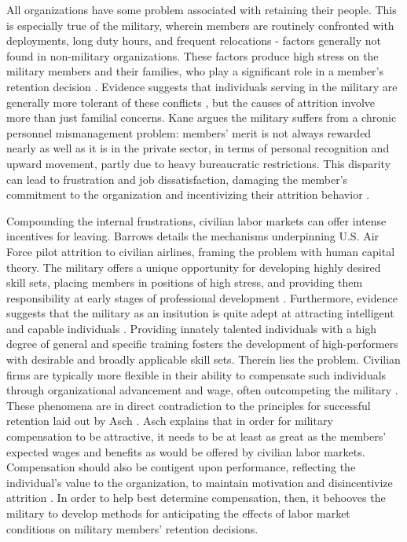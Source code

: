 \documentclass[12pt,letterpaper,toc=flat,oneside]{report}
\theoremstyle{definition}
\theoremstyle{definition}
\theoremstyle{definition}
\theoremstyle{remark}
\begin{document}
All organizations have some problem associated with retaining their
people. This is especially true of the military, wherein members are
routinely confronted with deployments, long duty hours, and frequent
relocations - factors generally not found in non-military organizations.
These factors produce high stress on the military members and their
families, who play a significant role in a member's retention decision
\cite{fugita-lakhani-1991}. Evidence suggests that individuals serving
in the military are generally more tolerant of these conflicts
\cite{capon-etal-2007}, but the causes of attrition involve more than
just familial concerns. Kane \cite{kane-2012} argues the military
suffers from a chronic personnel mismanagement problem: members' merit
is not always rewarded nearly as well as it is in the private sector, in
terms of personal recognition and upward movement, partly due to heavy
bureaucratic restrictions. This disparity can lead to frustration and
job dissatisfaction, damaging the member's commitment to the
organization and incentivizing their attrition behavior
\cite{capon-etal-2007}.

Compounding the internal frustrations, civilian labor markets can offer
intense incentives for leaving. Barrows \cite{barrows-1993} details the
mechanisms underpinning U.S. Air Force pilot attrition to civilian
airlines, framing the problem with human capital theory. The military
offers a unique opportunity for developing highly desired skill sets,
placing members in positions of high stress, and providing them
responsibility at early stages of professional development
\cite{kane-2012}. Furthermore, evidence suggests that the military as an
insitution is quite adept at attracting intelligent and capable
individuals \cite{asch-hosek-2004}. Providing innately talented
individuals with a high degree of general and specific training fosters
the development of high-performers with desirable and broadly applicable
skill sets. Therein lies the problem. Civilian firms are typically more
flexible in their ability to compensate such individuals through
organizational advancement and wage, often outcompeting the military
\cite{kane-2012}. These phenomena are in direct contradiction to the
principles for successful retention laid out by Asch \cite{asch-1993}.
Asch explains that in order for military compensation to be attractive,
it needs to be at least as great as the members' expected wages and
benefits as would be offered by civilian labor markets. Compensation
should also be contigent upon performance, reflecting the individual's
value to the organization, to maintain motivation and disincentivize
attrition \cite{asch-1993}. In order to help best determine
compensation, then, it behooves the military to develop methods for
anticipating the effects of labor market conditions on military members'
retention decisions.
\end{document}

